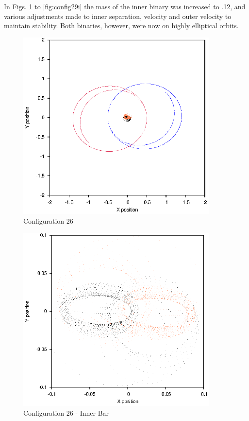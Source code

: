 \documentclass[a4paper,12pt]{article}
\begin{document}
In Figs. \ref{fig:config26} to \ref{fig:config29i} the mass of the inner binary was increased to .12, and various adjustments made to inner separation, velocity and outer velocity to maintain stability. 
Both binaries, however, were now on highly elliptical orbits.
\begin{figure}[H]
\centering
\includegraphics[width=0.9\textwidth]{./2017results/12-105-11-015/Orbit.eps}
\caption{Configuration 26}
\label{fig:config26}
\end{figure}
\begin{figure}[H]
\centering
\includegraphics[width=0.9\textwidth]{./2017results/12-105-11-015/Inner.eps}
\caption{Configuration 26 - Inner Bar}
\label{fig:config26i}
\end{figure}
\end{document}
